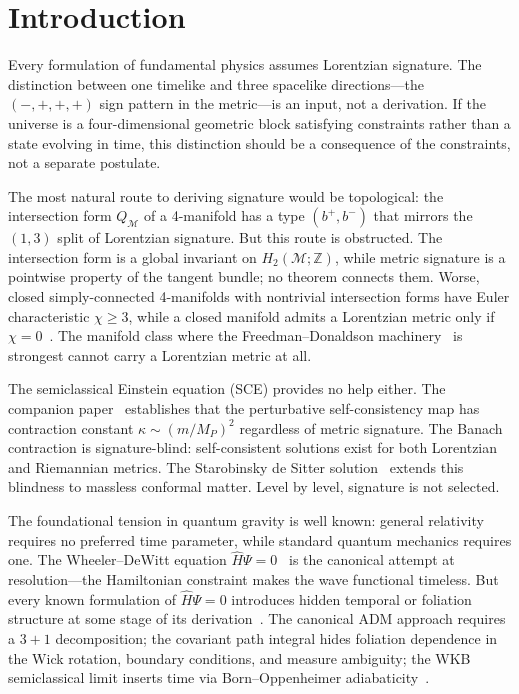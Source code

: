 \documentclass[12pt,a4paper]{article}
\theoremstyle{definition}
\theoremstyle{remark}
\begin{document}
\section{Introduction}
\label{sec:intro}

Every formulation of fundamental physics assumes Lorentzian signature.
The distinction between one timelike and three spacelike directions---the
$(-,+,+,+)$ sign pattern in the metric---is an input, not a derivation.
If the universe is a four-dimensional geometric block satisfying
constraints rather than a state evolving in time, this distinction should
be a consequence of the constraints, not a separate postulate.

The most natural route to deriving signature would be topological: the
intersection form $Q_\mathcal{M}$ of a 4-manifold has a type $(b^+, b^-)$
that mirrors the $(1,3)$ split of Lorentzian signature. But this route is
obstructed. The intersection form is a global invariant on
$H_2(\mathcal{M};\mathbb{Z})$, while metric signature is a pointwise
property of the tangent bundle; no theorem connects them. Worse, closed
simply-connected 4-manifolds with nontrivial intersection forms have
Euler characteristic $\chi \geq 3$, while a closed manifold admits a
Lorentzian metric only if $\chi = 0$~\cite{geroch}. The manifold class
where the Freedman--Donaldson machinery~\cite{freedman,donaldson} is
strongest cannot carry a Lorentzian metric at all.

The semiclassical Einstein equation (SCE) provides no help either. The
companion paper~\cite{fixed_point} establishes that the perturbative
self-consistency map has contraction constant $\kappa \sim (m/M_P)^2$
regardless of metric signature. The Banach contraction is
signature-blind: self-consistent solutions exist for both Lorentzian and
Riemannian metrics. The Starobinsky de Sitter solution~\cite{starobinsky}
extends this blindness to massless conformal matter. Level by level,
signature is not selected.

The foundational tension in quantum gravity is well known: general
relativity requires no preferred time parameter, while standard quantum
mechanics requires one. The Wheeler--DeWitt equation
$\hat{H}\Psi = 0$~\cite{dewitt,wheeler} is the canonical attempt at
resolution---the Hamiltonian constraint makes the wave functional
timeless. But every known formulation of $\hat{H}\Psi = 0$ introduces
hidden temporal or foliation structure at some stage of its
derivation~\cite{kuchar}. The canonical ADM approach requires a $3+1$
decomposition; the covariant path integral hides foliation dependence in
the Wick rotation, boundary conditions, and measure ambiguity; the WKB
semiclassical limit inserts time via Born--Oppenheimer
adiabaticity~\cite{halliwell,banks}.
\end{document}
